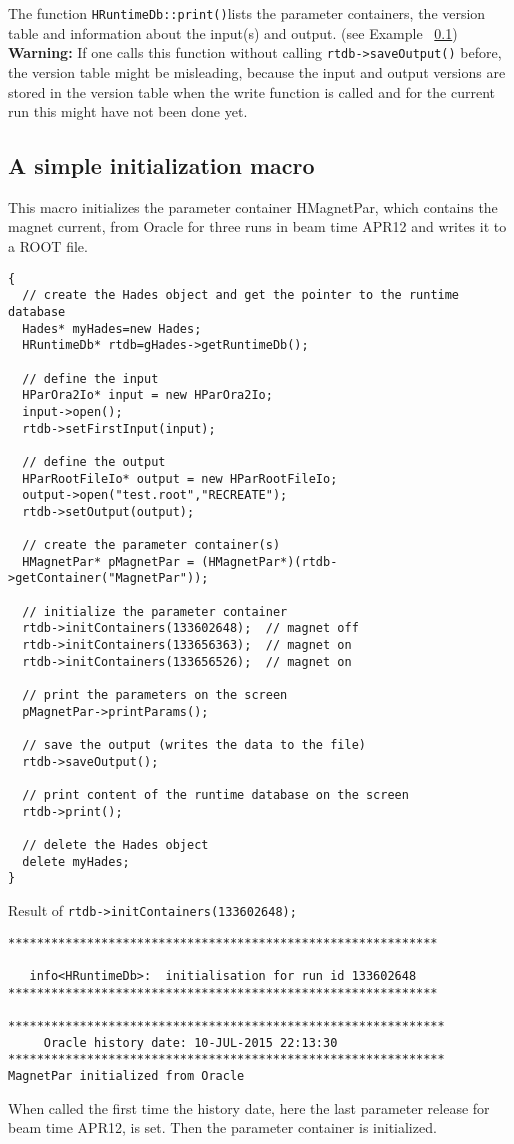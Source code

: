 The function \verb+HRuntimeDb::print()+lists the parameter containers, the version table and information about the 
input(s) and output. (see Example ~\ref{sec:rtdbSimpleMacro})\\
\textbf{Warning:} If one calls this function without calling \verb+rtdb->saveOutput()+ before, the version table might be 
misleading, because the input and output versions are stored in the version table when the write function is called and 
for the current run this might have not been done yet.


\subsection{A simple initialization macro} \label{sec:rtdbSimpleMacro}

This macro initializes the parameter container HMagnetPar, which contains the magnet current, from Oracle for three runs 
in beam time APR12 and writes it to a ROOT file.
\begin{lstlisting}
{
  // create the Hades object and get the pointer to the runtime database  
  Hades* myHades=new Hades;
  HRuntimeDb* rtdb=gHades->getRuntimeDb();

  // define the input
  HParOra2Io* input = new HParOra2Io;
  input->open();
  rtdb->setFirstInput(input);

  // define the output
  HParRootFileIo* output = new HParRootFileIo;
  output->open("test.root","RECREATE");
  rtdb->setOutput(output);

  // create the parameter container(s)
  HMagnetPar* pMagnetPar = (HMagnetPar*)(rtdb->getContainer("MagnetPar"));

  // initialize the parameter container
  rtdb->initContainers(133602648);  // magnet off
  rtdb->initContainers(133656363);  // magnet on
  rtdb->initContainers(133656526);  // magnet on  
  
  // print the parameters on the screen  
  pMagnetPar->printParams();

  // save the output (writes the data to the file)
  rtdb->saveOutput();

  // print content of the runtime database on the screen
  rtdb->print();

  // delete the Hades object
  delete myHades;
}
\end{lstlisting}

Result of \verb+rtdb->initContainers(133602648);+
\begin{lstlisting}
************************************************************

   info<HRuntimeDb>:  initialisation for run id 133602648
************************************************************

*************************************************************
     Oracle history date: 10-JUL-2015 22:13:30
*************************************************************
MagnetPar initialized from Oracle
\end{lstlisting}
When called the first time the history date, here the last parameter release for beam time APR12, is set.
Then the parameter container is initialized.\\

